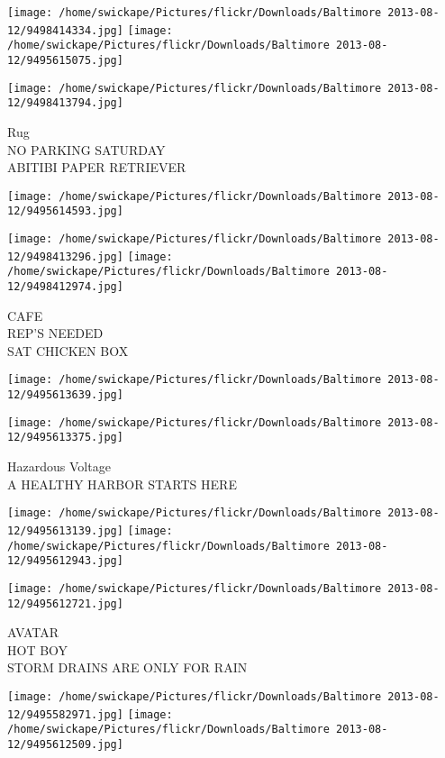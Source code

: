 \documentclass[10pt,letterpaper]{article}
\begin{document}
\texttt{[image: /home/swickape/Pictures/flickr/Downloads/Baltimore 2013-08-12/9498414334.jpg]}
\texttt{[image: /home/swickape/Pictures/flickr/Downloads/Baltimore 2013-08-12/9495615075.jpg]}

\vspace{0.25in}
\texttt{[image: /home/swickape/Pictures/flickr/Downloads/Baltimore 2013-08-12/9498413794.jpg]}

Rug\\
NO PARKING SATURDAY\\
ABITIBI PAPER RETRIEVER
\pagebreak

\texttt{[image: /home/swickape/Pictures/flickr/Downloads/Baltimore 2013-08-12/9495614593.jpg]}

\vspace{0.25in}
\texttt{[image: /home/swickape/Pictures/flickr/Downloads/Baltimore 2013-08-12/9498413296.jpg]}
\texttt{[image: /home/swickape/Pictures/flickr/Downloads/Baltimore 2013-08-12/9498412974.jpg]}

CAFE\\
REP'S NEEDED\\
SAT CHICKEN BOX
\pagebreak

\texttt{[image: /home/swickape/Pictures/flickr/Downloads/Baltimore 2013-08-12/9495613639.jpg]}

\vspace{0.25in}
\texttt{[image: /home/swickape/Pictures/flickr/Downloads/Baltimore 2013-08-12/9495613375.jpg]}

Hazardous Voltage\\
A HEALTHY HARBOR STARTS HERE
\pagebreak

\texttt{[image: /home/swickape/Pictures/flickr/Downloads/Baltimore 2013-08-12/9495613139.jpg]}
\texttt{[image: /home/swickape/Pictures/flickr/Downloads/Baltimore 2013-08-12/9495612943.jpg]}

\vspace{0.25in}
\texttt{[image: /home/swickape/Pictures/flickr/Downloads/Baltimore 2013-08-12/9495612721.jpg]}

AVATAR\\
HOT BOY\\
STORM DRAINS ARE ONLY FOR RAIN
\pagebreak

\texttt{[image: /home/swickape/Pictures/flickr/Downloads/Baltimore 2013-08-12/9495582971.jpg]}
\texttt{[image: /home/swickape/Pictures/flickr/Downloads/Baltimore 2013-08-12/9495612509.jpg]}
\end{document}
